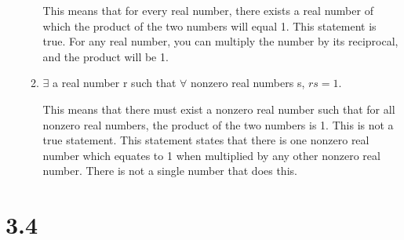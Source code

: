 \documentclass{article}
\begin{document}
\begin{enumerate}
\begin{enumerate}
        This means that for every real number, there exists a real number of which the product of the two numbers will equal 1. This statement is true. For any real number, you can multiply the number by its reciprocal, and the product will be 1.
        \item $\exists$ a real number r such that $\forall$ nonzero real numbers s, $rs=1$.

        This means that there must exist a nonzero real number such that for all nonzero real numbers, the product of the two numbers is 1. This is not a true statement. This statement states that there is one nonzero real number which equates to 1 when multiplied by any other nonzero real number. There is not a single number that does this.
    \end{enumerate}
\end{enumerate}

\section{3.4}
\end{document}
